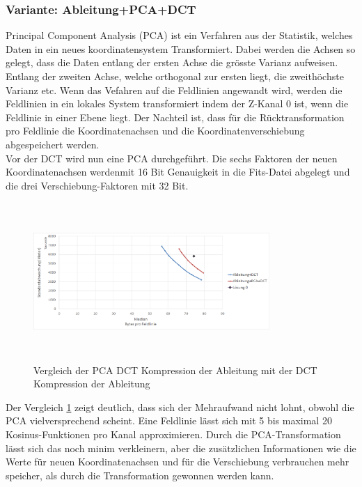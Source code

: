 \subsubsection{Variante: Ableitung+PCA+DCT} 
Principal Component Analysis (PCA)\cite{abdi2010principal} ist ein Verfahren aus der Statistik, welches Daten in ein neues koordinatensystem Transformiert. Dabei werden die Achsen so gelegt, dass die Daten entlang der ersten Achse die grösste Varianz aufweisen. Entlang der zweiten Achse, welche orthogonal zur ersten liegt, die zweithöchste Varianz etc. Wenn das Vefahren auf die Feldlinien angewandt wird, werden die Feldlinien in ein lokales System transformiert indem der Z-Kanal 0 ist, wenn die Feldlinie in einer Ebene liegt. Der Nachteil ist, dass für die Rücktransformation pro Feldlinie die Koordinatenachsen und die Koordinatenverschiebung abgespeichert werden.\\
Vor der DCT wird nun eine PCA durchgeführt. Die sechs Faktoren der neuen Koordinatenachsen werdenmit  16 Bit Genauigkeit in die Fits-Datei abgelegt und die drei Verschiebung-Faktoren mit 32 Bit.
\begin{figure}[!htbp]
	\center
	\includegraphics[width=0.8\textwidth,height=6cm,keepaspectratio]{./pictures/resultate/loesung1/loesung1-4/loesung1_4.png}
	\caption{Vergleich der PCA DCT Kompression der Ableitung mit der DCT Kompression der Ableitung}
	\label{resultate:loesung1:dct:pca}
\end{figure}
Der Vergleich \ref{resultate:loesung1:dct:pca} zeigt deutlich, dass sich der Mehraufwand nicht lohnt, obwohl die PCA vielversprechend scheint. Eine Feldlinie lässt sich mit 5 bis maximal 20 Kosinus-Funktionen pro Kanal approximieren. Durch die PCA-Transformation lässt sich das noch minim verkleinern, aber die zusätzlichen Informationen wie die Werte für neuen Koordinatenachsen und für die Verschiebung verbrauchen mehr speicher, als durch die Transformation gewonnen werden kann.\\
